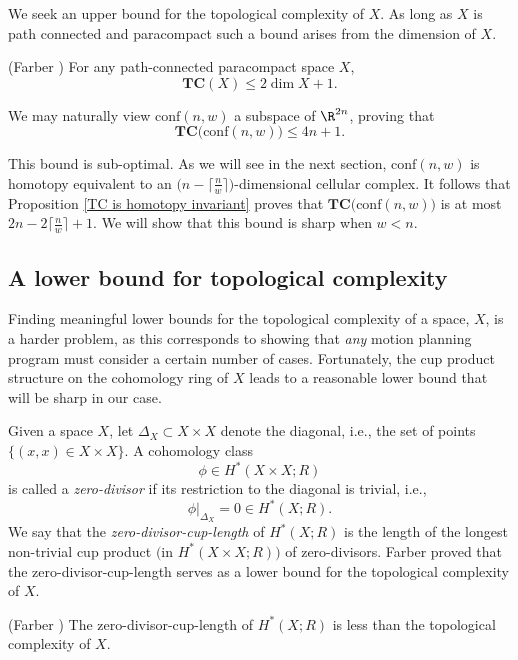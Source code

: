 We seek an upper bound for the topological complexity of $X$.
As long as $X$ is path connected and paracompact such a bound arises from the dimension of $X$.

\begin{prop}\label{upper bound}
(Farber \cite[Theorem 4]{farber2003topological})
For any path-connected paracompact space $X$,
\[
\textbf{TC}(X)\le 2\dim X+1.
\]
\end{prop}

We may naturally view $\text{conf}(n,w)$ a subspace of $\R^{2n}$, proving that 
\[
\textbf{TC}\big(\text{conf}(n,w)\big)\le 4n+1.
\]

This bound is sub-optimal. 
As we will see in the next section, $\text{conf}(n,w)$ is homotopy equivalent to an $\big(n-\big\lceil\frac{n}{w}\big\rceil\big)$-dimensional cellular complex.
It follows that Proposition \ref{TC is homotopy invariant} proves that $\textbf{TC}\big(\text{conf}(n,w)\big)$ is at most $2n-2\big\lceil\frac{n}{w}\big\rceil+1$.
We will show that this bound is sharp when $w<n$.

\subsection{A lower bound for topological complexity}
Finding meaningful lower bounds for the topological complexity of a space, $X$, is a harder problem, as this corresponds to showing that \emph{any} motion planning program must consider a certain number of cases. 
Fortunately, the cup product structure on the cohomology ring of $X$ leads to a reasonable lower bound that will be sharp in our case.

Given a space $X$, let $\Delta_{X}\subset X\times X$ denote the diagonal, i.e., the set of points $\big\{(x, x)\in X\times X\big\}$.
A cohomology class 
\[
\phi\in H^{*}(X\times X;R)
\]
is called a \emph{zero-divisor} if its restriction to the diagonal is trivial, i.e.,
\[
\phi|_{\Delta_{X}}=0\in H^{*}(X;R).
\]
We say that the \emph{zero-divisor-cup-length} of $H^{*}(X;R)$ is the length of the longest non-trivial cup product $\big($in $H^{*}(X\times X;R)\big)$ of zero-divisors.
Farber proved that the zero-divisor-cup-length serves as a lower bound for the topological complexity of $X$.

\begin{prop}\label{cup product lower bound general}
(Farber \cite[Theorem 7]{farber2003topological})
The zero-divisor-cup-length of $H^{*}(X;R)$ is less than the topological complexity of $X$.
\end{prop}

